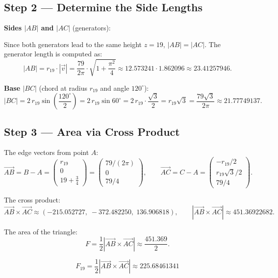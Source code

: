 \subsection*{Step 2 --- Determine the Side Lengths}

\textbf{Sides $|AB|$ and $|AC|$} (generators):

Since both generators lead to the same height $z = 19$,
$|AB| = |AC|$. The generator length is computed as:
\[
  |AB|
  = r_{19}\cdot|\vec{v}|
  = \frac{79}{2\pi}\cdot\sqrt{1+\frac{\pi^2}{4}}
  \approx 12.573241\cdot 1.862096
  \approx 23.41257946.
\]

\textbf{Base $|BC|$} (chord at radius $r_{19}$ and angle $120^\circ$):
\[
  |BC|
  = 2\,r_{19}\sin\!\left(\frac{120^\circ}{2}\right)
  = 2\,r_{19}\sin 60^\circ
  = 2\,r_{19}\cdot\frac{\sqrt{3}}{2}
  = r_{19}\sqrt{3}
  = \frac{79\sqrt{3}}{2\pi}
  \approx 21.77749137.
\]

\subsection*{Step 3 --- Area via Cross Product}

The edge vectors from point $A$:
\[
  \overrightarrow{AB} = B - A
  = \begin{pmatrix}r_{19}\\0\\19+\tfrac{3}{4}\end{pmatrix}
  = \begin{pmatrix}79/(2\pi)\\0\\79/4\end{pmatrix},
  \qquad
  \overrightarrow{AC} = C - A
  = \begin{pmatrix}-r_{19}/2\\ r_{19}\sqrt{3}/2\\79/4\end{pmatrix}.
\]

The cross product:
\[
  \overrightarrow{AB}\times\overrightarrow{AC}
  \approx (-215.052727,\; -372.482250,\; 136.906818),
  \qquad
  \left|\overrightarrow{AB}\times\overrightarrow{AC}\right|
  \approx 451.36922682.
\]

The area of the triangle:
\[
  F
  = \frac{1}{2}\left|\overrightarrow{AB}\times\overrightarrow{AC}\right|
  \approx \frac{451.369}{2}.
\]

\begin{satz}[Triangular Area at $n=19$]
\begin{equation}
  \boxed{F_{19} = \frac{1}{2}\left|\overrightarrow{AB}\times\overrightarrow{AC}\right|
  \approx 225.68461341}
\end{equation}
\end{satz}

